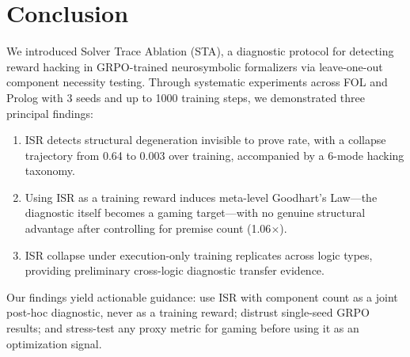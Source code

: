 \documentclass[11pt,a4paper]{article}
\newcommand{\isr}{\textsc{ISR}}
\newcommand{\sta}{\textsc{STA}}
\begin{document}
\section{Conclusion}
\label{sec:conclusion}

We introduced Solver Trace Ablation (\sta{}), a diagnostic protocol for detecting reward hacking in GRPO-trained neurosymbolic formalizers via leave-one-out component necessity testing.
Through systematic experiments across FOL and Prolog with 3 seeds and up to 1000 training steps, we demonstrated three principal findings:

\begin{enumerate}[nosep]
\item \isr{} detects structural degeneration invisible to prove rate, with a collapse trajectory from 0.64 to 0.003 over training, accompanied by a 6-mode hacking taxonomy.
\item Using \isr{} as a training reward induces meta-level Goodhart's Law---the diagnostic itself becomes a gaming target---with no genuine structural advantage after controlling for premise count (1.06$\times$).
\item \isr{} collapse under execution-only training replicates across logic types, providing preliminary cross-logic diagnostic transfer evidence.
\end{enumerate}

Our findings yield actionable guidance: use \isr{} with component count as a joint post-hoc diagnostic, never as a training reward; distrust single-seed GRPO results; and stress-test any proxy metric for gaming before using it as an optimization signal.



\end{document}
